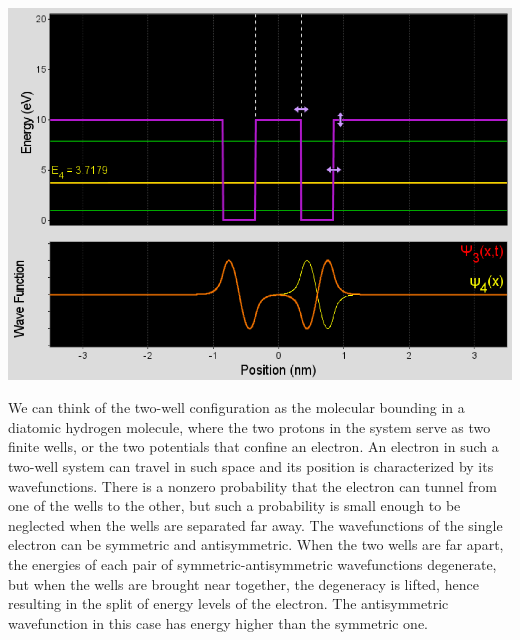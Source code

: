 \documentclass[11pt]{book}
\theoremstyle{break}
\theoremstyle{break}
\begin{document}
\begin{center}
\includegraphics[scale=0.38]{2d}
\end{center}

We can think of the two-well configuration as the molecular bounding in a diatomic hydrogen molecule, where the two protons in the system serve as two finite wells, or the two potentials that confine an electron. An electron in such a two-well system can travel in such space and its position is characterized by its wavefunctions. There is a nonzero probability that the electron can tunnel from one of the wells to the other, but such a probability is small enough to be neglected when the wells are separated far away. The wavefunctions of the single electron can be symmetric and antisymmetric. When the two wells are far apart, the energies of each pair of symmetric-antisymmetric wavefunctions degenerate, but when the wells are brought near together, the degeneracy is lifted, hence resulting in the split of energy levels of the electron. The antisymmetric wavefunction in this case has energy higher than the symmetric one. \\
\end{document}
